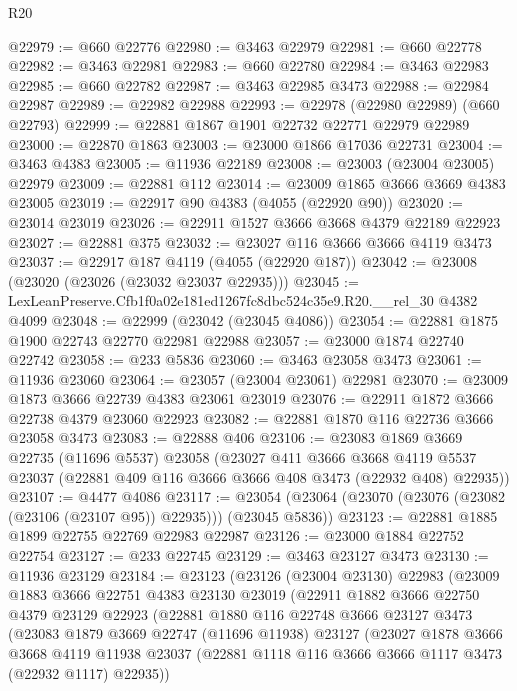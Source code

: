 \begin{lexlean}{R20}
\begin{coremodule}
@22979 := @660 @22776
@22980 := @3463 @22979
@22981 := @660 @22778
@22982 := @3463 @22981
@22983 := @660 @22780
@22984 := @3463 @22983
@22985 := @660 @22782
@22987 := @3463 @22985 @3473
@22988 := @22984 @22987
@22989 := @22982 @22988
@22993 := @22978 (@22980 @22989) (@660 @22793)
@22999 := @22881 @1867 @1901 @22732 @22771 @22979 @22989
@23000 := @22870 @1863
@23003 := @23000 @1866 @17036 @22731
@23004 := @3463 @4383
@23005 := @11936 @22189
@23008 := @23003 (@23004 @23005) @22979
@23009 := @22881 @112
@23014 := @23009 @1865 @3666 @3669 @4383 @23005
@23019 := @22917 @90 @4383 (@4055 (@22920 @90))
@23020 := @23014 @23019
@23026 := @22911 @1527 @3666 @3668 @4379 @22189 @22923
@23027 := @22881 @375
@23032 := @23027 @116 @3666 @3666 @4119 @3473
@23037 := @22917 @187 @4119 (@4055 (@22920 @187))
@23042 := @23008 (@23020 (@23026 (@23032 @23037 @22935)))
@23045 := LexLeanPreserve.Cfb1f0a02e181ed1267fc8dbc524c35e9.R20.__rel_30 @4382 @4099
@23048 := @22999 (@23042 (@23045 @4086))
@23054 := @22881 @1875 @1900 @22743 @22770 @22981 @22988
@23057 := @23000 @1874 @22740 @22742
@23058 := @233 @5836
@23060 := @3463 @23058 @3473
@23061 := @11936 @23060
@23064 := @23057 (@23004 @23061) @22981
@23070 := @23009 @1873 @3666 @22739 @4383 @23061 @23019
@23076 := @22911 @1872 @3666 @22738 @4379 @23060 @22923
@23082 := @22881 @1870 @116 @22736 @3666 @23058 @3473
@23083 := @22888 @406
@23106 := @23083
    @1869
    @3669
    @22735
    (@11696 @5537)
    @23058
    (@23027
      @411
      @3666
      @3668
      @4119
      @5537
      @23037
      (@22881 @409 @116 @3666 @3666 @408 @3473 (@22932 @408) @22935))
@23107 := @4477 @4086
@23117 := @23054 (@23064 (@23070 (@23076 (@23082 (@23106 (@23107 @95)) @22935))) (@23045 @5836))
@23123 := @22881 @1885 @1899 @22755 @22769 @22983 @22987
@23126 := @23000 @1884 @22752 @22754
@23127 := @233 @22745
@23129 := @3463 @23127 @3473
@23130 := @11936 @23129
@23184 := @23123
    (@23126
      (@23004 @23130)
      @22983
      (@23009
        @1883
        @3666
        @22751
        @4383
        @23130
        @23019
        (@22911
          @1882
          @3666
          @22750
          @4379
          @23129
          @22923
          (@22881
            @1880
            @116
            @22748
            @3666
            @23127
            @3473
            (@23083
              @1879
              @3669
              @22747
              (@11696 @11938)
              @23127
              (@23027
                @1878
                @3666
                @3668
                @4119
                @11938
                @23037
                (@22881 @1118 @116 @3666 @3666 @1117 @3473 (@22932 @1117) @22935))

\end{coremodule}
\end{lexlean}
